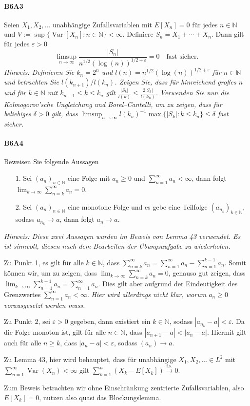 \documentclass{article}
\begin{document}
\paragraph{B6A3}
Seien $X_1,X_2,\dots$ unabhängige Zufallsvariablen mit $E[X_n]=0$ für jedes $n\in\mathbb{N}$ und $V:=\sup\{\operatorname{Var}[X_n]:n\in\mathbb{N}\}<\infty$.
Definiere $S_n=X_1+\cdots+X_n$.
Dann gilt für jedes $\varepsilon>0$
\[
  \limsup_{n\to\infty}\frac{|S_n|}{n^{1/2}(\log(n))^{1/2+\varepsilon}}=0\quad\text{fast sicher.}
\]
\emph{Hinweis: Definieren Sie $k_n=2^n$ und $l(n)=n^{1/2}(\log(n))^{1/2+\varepsilon}$ für $n\in\mathbb{N}$ und betrachten Sie $l(k_{n+1})/l(k_n)$.
  Zeigen Sie, dass für hinreichend großes $n$ und für $k\in\mathbb{N}$ mit $k_{n-1}\leq k\leq k_n$ gilt $\frac{|S_k|}{l(k)}\leq\frac{2|S_k|}{l({k_n})}$.
Verwenden Sie nun die Kolmogorov'sche Ungleichung und Borel--Cantelli, um zu zeigen, dass für beliebiges $\delta>0$ gilt, dass $\limsup_{n\to\infty}l(k_n)^{-1}\max\{|S_k|: k\leq k_n\}\leq\delta$ fast sicher.}
\newpage

\paragraph{B6A4}
Beweisen Sie folgende Aussagen
\begin{enumerate}
\item[1.] Sei $(a_n)_{n\in\mathbb{N}}$ eine Folge mit $a_n\geq0$ und $\sum_{n=1}^\infty a_n<\infty$, dann folgt $\lim_{k\to\infty}\sum_{n=k}^\infty a_n=0$.
\item[2.] Sei $(a_n)_{n\in\mathbb{N}}$ eine monotone Folge und es gebe eine Teilfolge $(a_{n_k})_{k\in\mathbb{N}}$, sodass $a_{n_k}\to a$, dann folgt $a_n\to a$.
\end{enumerate}
\emph{Hinweis: Diese zwei Aussagen wurden im Beweis von Lemma 43 verwendet.
  Es ist sinnvoll, diesen nach dem Bearbeiten der Übungsaufgabe zu wiederholen.}

Zu Punkt 1, es gilt für alle $k\in\mathbb{N}$, dass $\sum_{n=k}^\infty a_n=\sum_{n=1}^\infty a_n-\sum_{n=1}^{k-1}a_n$.
Somit können wir, um zu zeigen, dass $\lim_{k\to\infty}\sum_{n=k}^\infty a_n=0$, genauso gut zeigen, dass $\lim_{k\to\infty}\sum_{n=1}^{k-1}a_n=\sum_{n=1}^\infty a_n$.
Dies gilt aber aufgrund der Eindeutigkeit des Grenzwertes $\sum_{n=1}^\infty a_n<\infty$.
\emph{Hier wird allerdings nicht klar, warum $a_n\geq0$ vorausgesetzt werden muss.}

Zu Punkt 2, sei $\varepsilon>0$ gegeben, dann existiert ein $k\in\mathbb{N}$, sodass $|a_{n_k}-a|<\varepsilon$.
Da die Folge monoton ist, gilt für alle $n\in\mathbb{N}$, dass $|a_{n+1}-a|<|a_{n}-a|$.
Hiermit gilt auch für alle $n\geq k$, dass $|a_n-a|<\varepsilon$, sodass $(a_n)\to a$.

Zu Lemma 43, hier wird behauptet, dass für unabhängige $X_1,X_2,\dots\in L^2$ mit  $\sum_{n=1}^\infty\operatorname{Var}(X_n)<\infty$ gilt $\sum_{k=1}^n(X_k-E[X_k])\xrightarrow{\text{f.s.}}0$.

Zum Beweis betrachten wir ohne Einschränkung zentrierte Zufallsvariablen, also $E[X_k]=0$, nutzen also quasi das Blockungslemma.
\newpage



\end{document}
